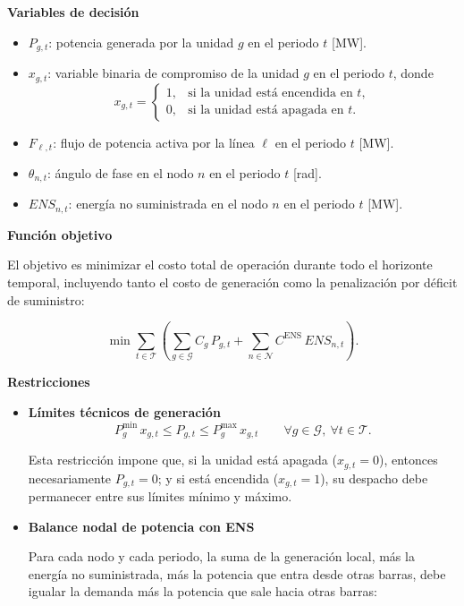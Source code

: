\begin{enumerate}
\textbf{Variables de decisión}
\begin{itemize}
    \item \(P_{g,t}\): potencia generada por la unidad \(g\) en el periodo \(t\) [MW].
    \item \(x_{g,t}\): variable binaria de compromiso de la unidad \(g\) en el periodo \(t\), donde
    \[
    x_{g,t}=
    \begin{cases}
    1, & \text{si la unidad está encendida en } t,\\
    0, & \text{si la unidad está apagada en } t.
    \end{cases}
    \]
    \item \(F_{\ell,t}\): flujo de potencia activa por la línea \(\ell\) en el periodo \(t\) [MW].
    \item \(\theta_{n,t}\): ángulo de fase en el nodo \(n\) en el periodo \(t\) [rad].
    \item \(ENS_{n,t}\): energía no suministrada en el nodo \(n\) en el periodo \(t\) [MW].
\end{itemize}

\textbf{Función objetivo}

El objetivo es minimizar el costo total de operación durante todo el horizonte temporal, incluyendo tanto el costo de generación como la penalización por déficit de suministro:

\begin{equation}
\min \sum_{t\in\mathcal{T}} \left(
\sum_{g\in\mathcal{G}} C_g\,P_{g,t}
+
\sum_{n\in\mathcal{N}} C^{\text{ENS}}\,ENS_{n,t}
\right).
\end{equation}

\textbf{Restricciones}

\begin{itemize}
    \item \textbf{Límites técnicos de generación}
    \begin{equation}
        P_g^{\min}\,x_{g,t} \le P_{g,t} \le P_g^{\max}\,x_{g,t}
        \qquad \forall g\in\mathcal{G},\ \forall t\in\mathcal{T}.
    \end{equation}

    Esta restricción impone que, si la unidad está apagada (\(x_{g,t}=0\)), entonces necesariamente \(P_{g,t}=0\); y si está encendida (\(x_{g,t}=1\)), su despacho debe permanecer entre sus límites mínimo y máximo.

    \item \textbf{Balance nodal de potencia con ENS}

    Para cada nodo y cada periodo, la suma de la generación local, más la energía no suministrada, más la potencia que entra desde otras barras, debe igualar la demanda más la potencia que sale hacia otras barras:


\end{itemize}
\end{enumerate}
